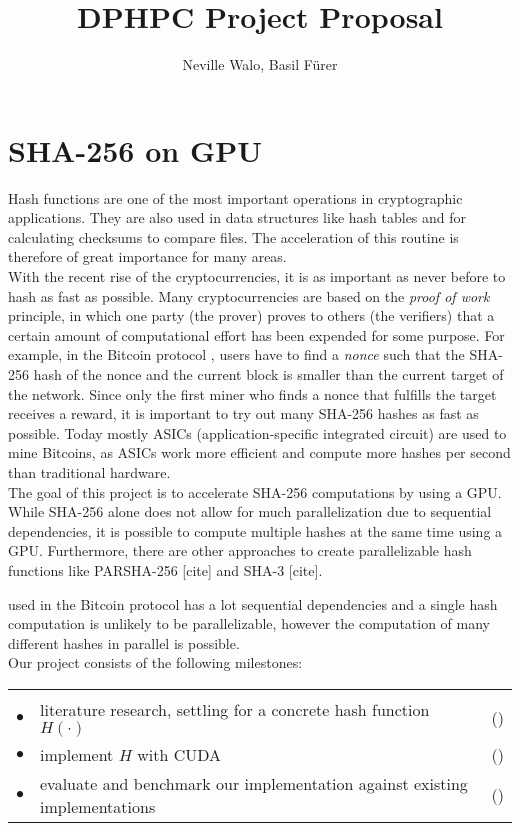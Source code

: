 \documentclass[a4paper]{article}
\author{Neville Walo, Basil F\"urer}
\title {DPHPC Project Proposal}
\newenvironment{reqlist}{%
  \par \medskip \noindent
  \begin{tabular}{cp{0.83\textwidth}r} \\[-24pt]}{\end{tabular}}
\newcommand{\req}{\\ \smallskip \smallskip $\bullet$\hspace{-0.2cm} & }
\newcounter{num}
\newcommand\effort[1]{\mbox{(\forloop{num}{0}{\value{num} < #1}{$\star$})}}
\begin{document}
\parindent 0pt
\maketitle

\section*{SHA-256 on GPU}
Hash functions are one of the most important operations in cryptographic applications. They are also used in data structures like hash tables and for calculating checksums to compare files. The acceleration of this routine is therefore of great importance for many areas.\\

With the recent rise of the cryptocurrencies, it is as important as never before to hash as fast as possible. 
Many cryptocurrencies are based on the \textit{proof of work} principle, in which one party (the prover) proves to others (the verifiers) that a certain amount of computational effort has been expended for some purpose. For example, in the Bitcoin protocol \cite{nakamoto2012bitcoin}, users have to find a \emph{nonce} such that the SHA-256 hash of the nonce and the current block is smaller than the current target of the network. Since only the first miner who finds a nonce that fulfills the target receives a reward, it is important to try out many SHA-256 hashes as fast as possible. Today mostly ASICs (application-specific integrated circuit) are used to mine Bitcoins, as ASICs work more efficient and compute more hashes per second than traditional hardware.\\


The goal of this project is to accelerate SHA-256 computations by using a GPU.
While SHA-256 alone does not allow for much parallelization due to sequential
dependencies, it is possible to compute multiple hashes at the same time using a GPU. Furthermore, there are other approaches to create parallelizable hash functions like PARSHA-256 [cite] and SHA-3 [cite].

 \cite{Dang13} used in the Bitcoin protocol has a lot sequential
dependencies and a single hash computation is unlikely to be parallelizable,
however the computation of many different hashes in parallel is possible.
\\

Our project consists of the following milestones:

\begin{reqlist}
  \req literature research, settling for a concrete hash function $H(\cdot)$
    & \effort{1}
  \req implement $H$ with CUDA~\cite{cuda}
    & \effort{3}
  \req evaluate and benchmark our implementation against existing
       implementations~\cite{bench}
    & \effort{2}
\end{reqlist}

\hfill



\end{document}

